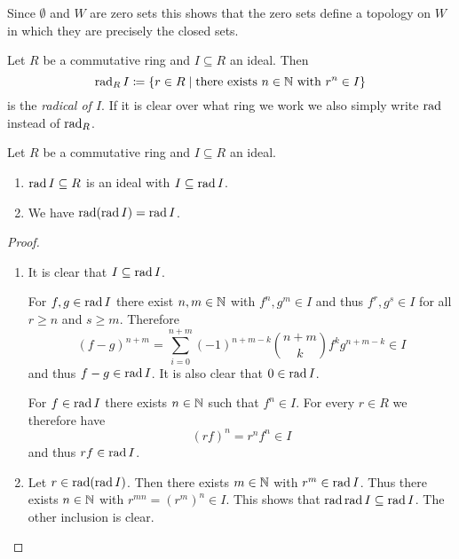 \begin{rem}
  Since $\emptyset$ and $W$ are zero sets this shows that the zero sets define a topology on $W$ in which they are precisely the closed sets.
\end{rem}


\begin{definition}
  Let $R$ be a commutative ring and $I \subseteq R$ an ideal. Then
  \[
              \operatorname{rad}_R I
    \coloneqq \{
                r \in R
              \mid
                \text{there exists }
                n \in \mathbb{N}
                \text{ with }
                r^n \in I
              \}
  \]
  is the \emph{radical of $I$}.
  If it is clear over what ring we work we also simply write $\operatorname{rad}$ instead of $\operatorname{rad}_R$.
\end{definition}


\begin{lemma}
  Let $R$ be a commutative ring and $I \subseteq R$ an ideal. 
  \begin{enumerate}[label=\emph{\alph*)},leftmargin=*]
    \item
      $\operatorname{rad} I  \subseteq R$ is an ideal with $I \subseteq \operatorname{rad} I$.
    \item
      We have $\operatorname{rad}(\operatorname{rad} I) = \operatorname{rad} I$.
  \end{enumerate}
\end{lemma}
\begin{proof}
  \begin{enumerate}[label=\emph{\alph*)},leftmargin=*]
    \item
      It is clear that $I \subseteq \operatorname{rad} I$.
      
      For $f,g \in \operatorname{rad} I$ there exist $n,m \in \mathbb{N}$ with $f^n, g^m \in I$ and thus $f^r, g^s \in I$ for all $r \geq n$ and $s \geq m$. Therefore
      \[
            (f - g)^{n+m}
        =   \sum_{i=0}^{n+m} (-1)^{n+m-k} \binom{n+m}{k} f^k g^{n+m-k}
        \in I
      \]
      and thus $f-g \in \operatorname{rad} I$. It is also clear that $0 \in \operatorname{rad} I$.
      
      For $f \in \operatorname{rad} I$ there exists $n \in \mathbb{N}$ such that $f^n \in I$.
      For every $r \in R$ we therefore have
      \[
            (rf)^n
        =   r^n f^n
        \in I
      \]
      and thus $rf \in \operatorname{rad} I$.
    \item
      Let $r \in \operatorname{rad}(\operatorname{rad} I)$.
      Then there exists $m \in \mathbb{N}$ with $r^m \in \operatorname{rad} I$.
      Thus there exists $n \in \mathbb{N}$ with $r^{mn} = (r^m)^n \in I$.
      This shows that $\operatorname{rad} \operatorname{rad} I \subseteq \operatorname{rad} I$.
      The other inclusion is clear.
    \qedhere
  \end{enumerate}
\end{proof}


